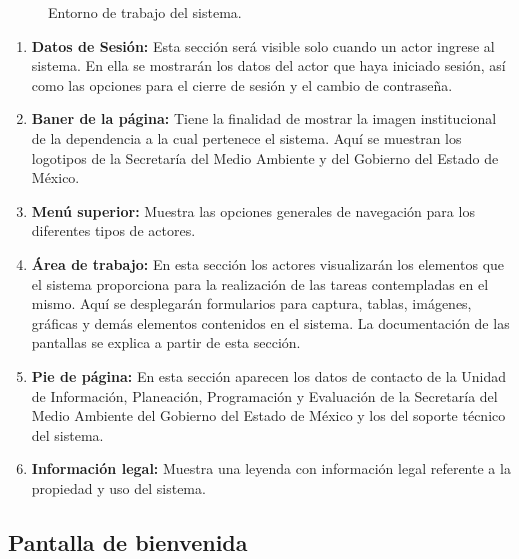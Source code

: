   \begin{figure}[ht!]
      \begin{center}
	  \caption{Entorno de trabajo del sistema.}
	  \label{fig:entornoDeTrabajo}
      \end{center}
  \end{figure}
  
  	\begin{enumerate}
		\item {\bf Datos de Sesión:} Esta sección será visible solo cuando un actor ingrese al sistema. En ella se mostrarán los datos del actor que haya iniciado sesión, así como las opciones para el cierre de sesión y el 
		cambio de contraseña.
		
		\item {\bf Baner de la página:} Tiene la finalidad de mostrar la imagen institucional de la dependencia a la cual pertenece el sistema. Aquí se muestran los logotipos de la Secretaría del Medio Ambiente y del 
		Gobierno del Estado de México.
		
		\item {\bf Menú superior:} Muestra las opciones generales de navegación para los diferentes tipos de actores.
		
		\item {\bf Área de trabajo:} En esta sección los actores visualizarán los elementos que el sistema proporciona para la realización de las tareas contempladas en el mismo. Aquí se desplegarán formularios para 
		captura, tablas, imágenes, gráficas y demás elementos contenidos en el sistema. La documentación de las pantallas se explica a partir de esta sección.
		
		\item {\bf Pie de página:} En esta sección aparecen los datos de contacto de la  Unidad de Información, Planeación, Programación y Evaluación de la Secretaría del Medio Ambiente del Gobierno del Estado de México y 
		los del soporte técnico del sistema.
		
		\item {\bf Información legal:} Muestra una leyenda con información legal referente a la propiedad y uso del sistema.
			
	\end{enumerate}


\subsection{Pantalla de bienvenida}
\label{ch:Interaccion:PantallaBienvenida}

